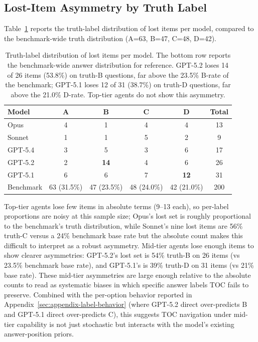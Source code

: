 \documentclass{article}
\begin{document}
\subsection{Lost-Item Asymmetry by Truth Label}

Table~\ref{tab:appendix-lost-by-label} reports the truth-label distribution of lost items per model, compared to the benchmark-wide truth distribution (A=63, B=47, C=48, D=42).

\begin{table}[h]
\centering
\small
\setlength{\tabcolsep}{8pt}
\begin{tabular}{lccccc}
\toprule
Model & A & B & C & D & Total \\
\midrule
Opus & 4 & 1 & 4 & 4 & 13 \\
Sonnet & 1 & 1 & 5 & 2 & 9 \\
GPT-5.4 & 3 & 5 & 3 & 6 & 17 \\
GPT-5.2 & 2 & \textbf{14} & 4 & 6 & 26 \\
GPT-5.1 & 6 & 6 & 7 & \textbf{12} & 31 \\
\midrule
Benchmark & 63 (31.5\%) & 47 (23.5\%) & 48 (24.0\%) & 42 (21.0\%) & 200 \\
\bottomrule
\end{tabular}
\caption{Truth-label distribution of lost items per model. The bottom row reports the benchmark-wide answer distribution for reference. GPT-5.2 loses 14 of 26 items (53.8\%) on truth-B questions, far above the 23.5\% B-rate of the benchmark; GPT-5.1 loses 12 of 31 (38.7\%) on truth-D questions, far above the 21.0\% D-rate. Top-tier agents do not show this asymmetry.}
\label{tab:appendix-lost-by-label}
\end{table}

Top-tier agents lose few items in absolute terms (9--13 each), so per-label proportions are noisy at this sample size; Opus's lost set is roughly proportional to the benchmark's truth distribution, while Sonnet's nine lost items are 56\% truth-C versus a 24\% benchmark base rate but the absolute count makes this difficult to interpret as a robust asymmetry. Mid-tier agents lose enough items to show clearer asymmetries: GPT-5.2's lost set is 54\% truth-B on 26 items (vs 23.5\% benchmark base rate), and GPT-5.1's is 39\% truth-D on 31 items (vs 21\% base rate). These mid-tier asymmetries are large enough relative to the absolute counts to read as systematic biases in which specific answer labels TOC fails to preserve. Combined with the per-option behavior reported in Appendix~\ref{sec:appendix-label-behavior} (where GPT-5.2 direct over-predicts B and GPT-5.1 direct over-predicts C), this suggests TOC navigation under mid-tier capability is not just stochastic but interacts with the model's existing answer-position priors.
\end{document}
